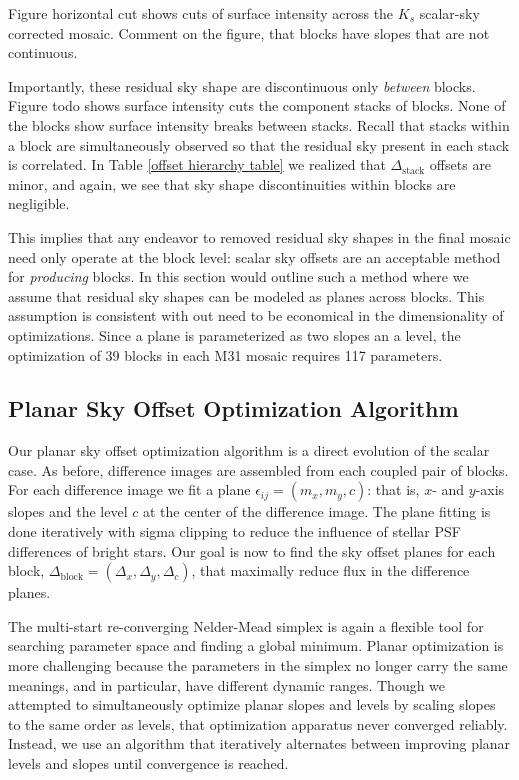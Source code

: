 \documentclass[iop]{emulateapj}
\newcommand{\todo}[1]{\textcolor{RedOrange}{#1}} %
\begin{document}
Figure \todo{horizontal cut} shows cuts of surface intensity across the $K_s$ scalar-sky corrected mosaic. \todo{Comment on the figure, that blocks have slopes that are not continuous}.

Importantly, these residual sky shape are discontinuous only \emph{between} blocks. Figure \todo{todo} shows surface intensity cuts the component stacks of blocks. None of the blocks show surface intensity breaks between stacks. Recall that stacks within a block are simultaneously observed so that the residual sky present in each stack is correlated. In Table \ref{offset hierarchy table} we realized that $\Delta_\mathrm{stack}$ offsets are minor, and again, we see that sky shape discontinuities within blocks are negligible.

This implies that any endeavor to removed residual sky shapes in the final mosaic need only operate at the block level: scalar sky offsets are an acceptable method for \emph{producing} blocks. In this section would outline such a method where we assume that residual sky shapes can be modeled as planes across blocks. This assumption is consistent with out need to be economical in the dimensionality of optimizations. Since a plane is parameterized as two slopes an a level, the optimization of 39 blocks in each M31 mosaic requires 117 parameters.

\subsection{Planar Sky Offset Optimization Algorithm}

Our planar sky offset optimization algorithm is a direct evolution of the scalar case. As before, difference images are assembled from each coupled pair of blocks. For each difference image we fit a plane $\epsilon_{ij} = (m_x, m_y, c)$: that is, $x$- and $y$-axis slopes and the level $c$ at the center of the difference image. The plane fitting is done iteratively with sigma clipping to reduce the influence of stellar PSF differences of bright stars. Our goal is now to find the sky offset planes for each block, $\Delta_\mathrm{block} = (\Delta_x, \Delta_y, \Delta_c)$, that maximally reduce flux in the difference planes.

The multi-start re-converging Nelder-Mead simplex is again a flexible tool for searching parameter space and finding a global minimum. Planar optimization is more challenging because the parameters in the simplex no longer carry the same meanings, and in particular, have different dynamic ranges. Though we attempted to simultaneously optimize planar slopes and levels by scaling slopes to the same order as levels, that optimization apparatus never converged reliably. Instead, we use an algorithm that iteratively alternates between improving planar levels and slopes until convergence is reached.
\end{document}
